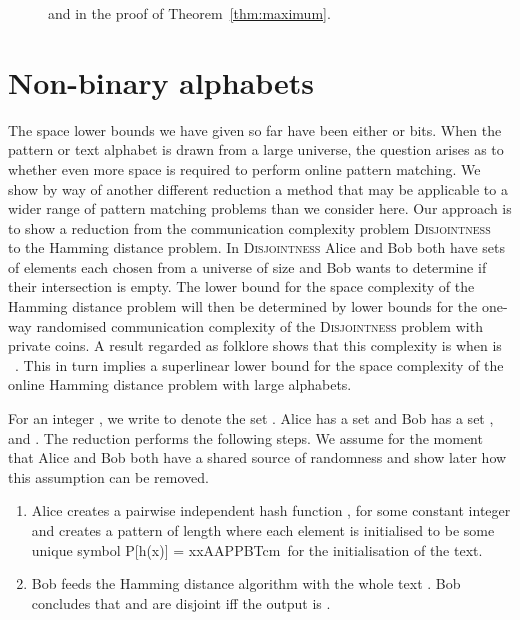 \documentclass{article}
\newcommand{\disjointness}{\textsc{Disjointness}\xspace}
\theoremstyle{plain}
\theoremstyle{definition}
\begin{document}
\begin{figure}[t]
    
    \caption{\label{fig:infinity} and  in the proof of Theorem~\ref{thm:maximum}.}
\end{figure}


\section{Non-binary alphabets}\label{sec:nonbinary}

The space lower bounds we have given so far have been either  or  bits. When the pattern or text alphabet is drawn from a large universe, the question arises as to whether even more space is required to perform online pattern matching.  We show by way of another different reduction a method that may be applicable to a wider range of pattern matching problems than we consider here. Our approach is to show a reduction from  the communication complexity problem \disjointness~\cite{Kushilevitz:97} to the Hamming distance problem.  In \disjointness Alice and Bob both have sets of  elements each chosen from a universe of size  and Bob wants to determine if their intersection is empty. The lower bound for the space complexity of the Hamming distance problem will then be determined by lower bounds for the one-way randomised communication complexity of the \disjointness problem with private coins.  A result regarded as folklore shows that this complexity is  when  is  ~\cite{Nisan:2011,P-folklore:09}. This in turn implies a superlinear lower bound for the space complexity of the online Hamming distance problem with large alphabets.

For an integer , we write  to denote the set . Alice has a set  and Bob has a set , and . The reduction performs the following steps. We assume for the moment that Alice and Bob both have a shared source of randomness and show later how this assumption can be removed.

\begin{enumerate}
 \item Alice creates a pairwise independent hash function , for some constant integer  and creates a pattern  of length  where each element is initialised to be some unique symbol \notin [U]P[h(x)] = xx\in AAPPBTcm\ for the initialisation of the text.
 \item Bob feeds the Hamming distance algorithm with the whole text . Bob concludes that  and  are disjoint iff the output is .
\end{enumerate}
\end{document}
